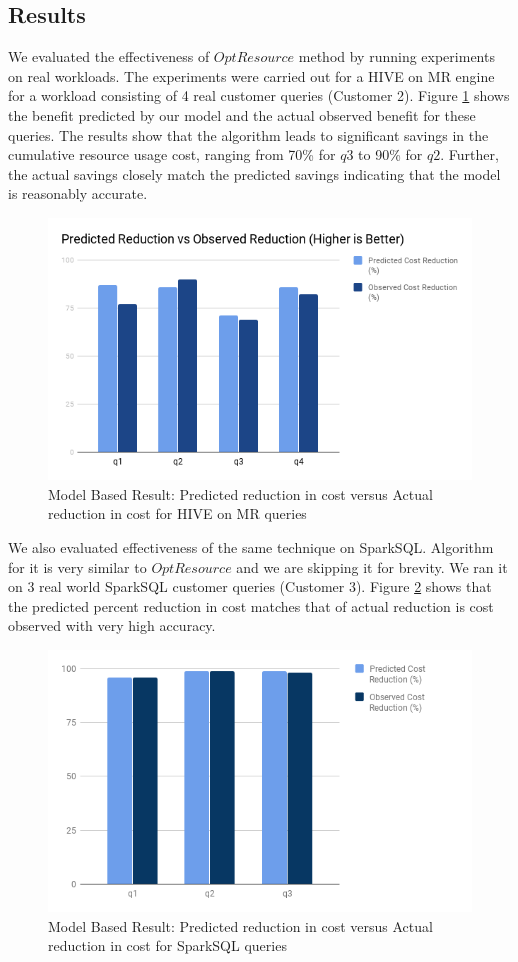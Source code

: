 \subsection{Results}
We evaluated the effectiveness of $OptResource$ method by running experiments on real workloads. The experiments were carried out for a HIVE on MR engine for a workload consisting of 4 real customer queries (Customer 2). 
Figure \ref{fig:modelbasedresult} shows the benefit predicted by our model and the actual observed benefit for these queries. The results show that the algorithm leads to significant savings in the cumulative resource usage cost, ranging from 70\% for $q3$ to 90\% for $q2$. Further, the actual savings closely match the predicted savings indicating that the model is reasonably accurate.

\begin{figure}[h]
	\includegraphics[width=\linewidth]{chart.png}
	\caption{Model Based Result: Predicted reduction in cost versus Actual reduction in cost for HIVE on MR queries}
	\label{fig:modelbasedresult}
\end{figure}

We also evaluated effectiveness of the same technique on SparkSQL. Algorithm for it is very similar to $OptResource$ and we are skipping it for brevity. We ran it on 3 real world SparkSQL customer queries (Customer 3). Figure \ref{fig:modelbasedresultspark} shows that the predicted percent reduction in cost matches that of actual reduction is cost observed with very high accuracy.

\begin{figure}[h]
	\includegraphics[width=\linewidth]{chart_spark.png}
	\caption{Model Based Result: Predicted reduction in cost versus Actual reduction in cost for SparkSQL queries}
	\label{fig:modelbasedresultspark}
\end{figure}
